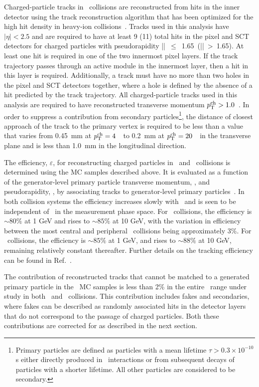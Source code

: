 Charged-particle tracks in \pbpb\ collisions are reconstructed from hits in the inner detector using the 
track reconstruction algorithm that has been optimized for the high hit density in heavy-ion
collisions~\cite{Aaboud:2017all}.
Tracks used in this analysis have $|\eta| < 2.5$ and are required to have at least 9 (11) total hits in the pixel and SCT detectors for charged particles with pseudorapidity \mbox{|\etatrk| $\leq$ 1.65 (|\etatrk| > 1.65)}.  At least one hit is required in one of the two innermost pixel layers.
If the track trajectory passes through an active module in the innermost layer, then 
a hit in this layer is required. Additionally, a track must 
have no more than two holes in the pixel and SCT detectors together, where 
a hole is defined by the absence of a hit predicted by the track 
trajectory. 
All charged-particle tracks used in this analysis are required to have reconstructed transverse momentum $\mbox{$p_{\mathrm{T}}^{\mathrm{ch}}$} > 1.0 $~\GeV. In order to suppress a contribution from
secondary particles\footnote{Primary particles are defined as particles with a mean lifetime $\tau>0.3\times 10^{-10}$ s either directly produced in \pp\ interactions or from subsequent decays of particles with a shorter lifetime. All other particles are considered to be secondary.}, the distance of closest approach of the track to the primary vertex is required to be less than a value that varies from 0.45~mm at $\mbox{$p_{\mathrm{T}}^{\mathrm{ch}}$}=4$~\GeV\ to 0.2~mm at $\mbox{$p_{\mathrm{T}}^{\mathrm{ch}}$}=20$~\GeV\ in the transverse plane and is less than 1.0~mm in the longitudinal direction.


The efficiency, $\varepsilon$, for reconstructing charged particles in \PbPb\ and \pp\ collisions is determined using 
the MC samples described above. It is evaluated as a function of the generator-level primary particle transverse
momentum, \pTtrue, and pseudorapidity, \etatrue, by associating tracks to generator-level primary particles~\cite{Aad:2010ah}.
In both collision systems the efficiency increases slowly with \pTtrue\ and is seen to be independent of \ptjet\ in the
measurement phase space. For \pbpb\ collisions, the efficiency is $\sim 80\%$ at 1 GeV and rises to $\sim 85\%$ at
10 GeV, with the variation in efficiency between the most central and peripheral \pbpb\ collisions being approximately 
3\%. For \pp\ collisions, the efficiency is $\sim85\%$ at 1 GeV, and rises to $\sim 88 \%$ at 10 GeV, remaining relatively
constant thereafter. Further details on the tracking efficiency can be found in \mbox{Ref. \cite{Aaboud:2017bzv}}. 

The contribution of reconstructed tracks that cannot be matched to a generated primary particle in the \pp\ MC samples is
less than 2\% in the entire \pttrk\ range under study in both \pp\ and \pbpb\ collisions. This contribution includes 
fakes and secondaries, where  fakes can be described as randomly associated hits in the detector layers that do not correspond to 
the passage of charged particles. Both these contributions are corrected for as described in the next section.








